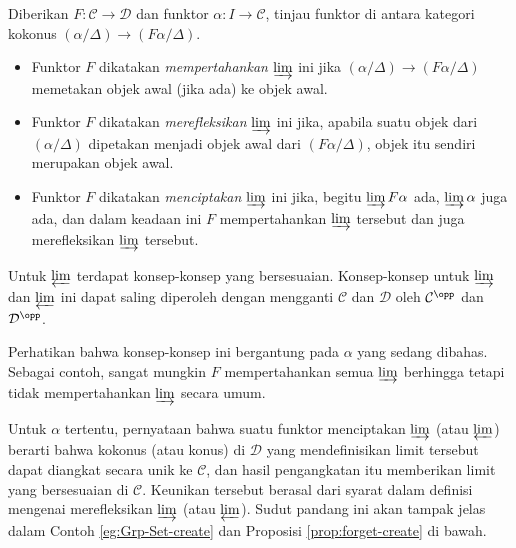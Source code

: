 \begin{definisi}\label{def:create-limit}
	Diberikan $F: \mathcal{C} \to \mathcal{D}$ dan funktor
	$\alpha: I \to \mathcal{C}$, tinjau funktor di antara kategori kokonus
	$(\alpha/\Delta) \to (F\alpha/\Delta)$.
	\begin{itemize}
		\item Funktor $F$ dikatakan \emph{mempertahankan} $\varinjlim$ ini jika
		$(\alpha/\Delta) \to (F\alpha/\Delta)$ memetakan objek awal (jika ada)
		ke objek awal.
		\item Funktor $F$ dikatakan \emph{merefleksikan} $\varinjlim$ ini jika,
		apabila suatu objek dari $(\alpha/\Delta)$ dipetakan menjadi objek awal
		dari $(F\alpha/\Delta)$, objek itu sendiri merupakan objek awal.
		\item Funktor $F$ dikatakan \emph{menciptakan} $\varinjlim$ ini jika,
		begitu $\varinjlim F\alpha$ ada, $\varinjlim \alpha$ juga ada, dan dalam
		keadaan ini $F$ mempertahankan $\varinjlim$ tersebut dan juga
		merefleksikan $\varinjlim$ tersebut.
	\end{itemize}
	Untuk $\varprojlim$ terdapat konsep-konsep yang bersesuaian. Konsep-konsep
	untuk $\varinjlim$ dan $\varprojlim$ ini dapat saling diperoleh dengan
	mengganti $\mathcal{C}$ dan $\mathcal{D}$ oleh
	$\mathcal{C}^{\opp}$ dan $\mathcal{D}^{\opp}$.
\end{definisi}

Perhatikan bahwa konsep-konsep ini bergantung pada $\alpha$ yang sedang
dibahas. Sebagai contoh, sangat mungkin $F$ mempertahankan semua
$\varinjlim$ berhingga tetapi tidak mempertahankan $\varinjlim$ secara umum.

Untuk $\alpha$ tertentu, pernyataan bahwa suatu funktor menciptakan
$\varinjlim$ (atau $\varprojlim$) berarti bahwa kokonus (atau
konus) di $\mathcal{D}$ yang mendefinisikan limit tersebut dapat diangkat
secara unik ke $\mathcal{C}$, dan hasil pengangkatan itu memberikan limit yang
bersesuaian di $\mathcal{C}$. Keunikan tersebut berasal dari syarat dalam
definisi mengenai merefleksikan $\varinjlim$ (atau $\varprojlim$). Sudut
pandang ini akan tampak jelas dalam Contoh \ref{eg:Grp-Set-create} dan
Proposisi \ref{prop:forget-create} di bawah.

